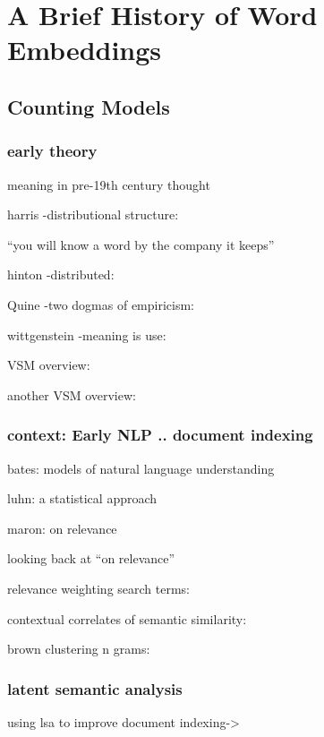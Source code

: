 \chapter{A Brief History of Word Embeddings}\label{chapter:a-brief-history}

\section{Counting Models}


\subsection{early theory}
meaning in pre-19th century thought~\cite{meier_oeser_2019_meaning_in}

harris -distributional structure:~\cite{harris_1954_distrib_struct}

``you will know a word by the company it keeps''~\cite{firth_1957_a_syn_of_lin}

hinton -distributed:~\cite{hinton1984distributed}

Quine -two dogmas of empiricism:~\cite{quine_1951_main_trends}

wittgenstein -meaning is use:~\cite{wittgenstein53_philos}

VSM overview:~\cite{turney10-from-frequen-to-meanin}

another VSM overview:~\cite{baroni-2010-distributional-memory}


\subsection{context: Early NLP .. document indexing}
bates: models of natural language understanding~\cite{bates-1995-models}

luhn: a statistical approach~\cite{luhn_1957_a_statistical_approach}

maron: on relevance~\cite{maron-1960-on-relevance}

looking back at ``on relevance''~\cite{thompson-2008-looking-back}

relevance weighting search terms:~\cite{robertson_1976_relevance_weighting}

contextual correlates of semantic similarity:~\cite{miller-1991-contextual-correlates}

brown clustering n grams:~\cite{brown-1990-class-based-ngram}

\subsection{latent semantic analysis}
using lsa to improve document indexing->~\cite{dumais-1988-using-lsa-to-improve}

